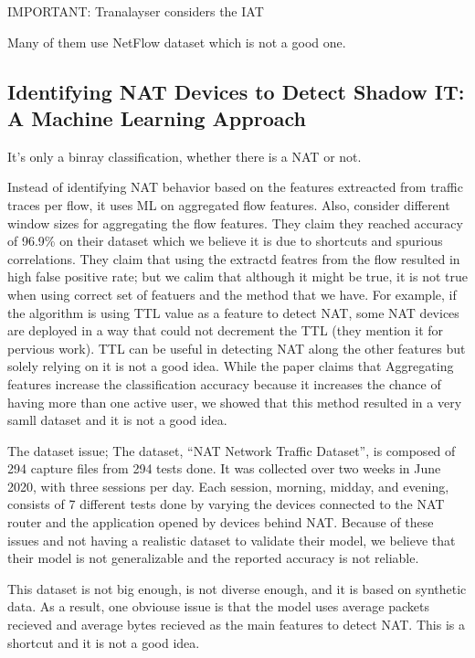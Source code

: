 IMPORTANT: Tranalayser considers the IAT 

Many of them use NetFlow dataset which is not a good one. 

\subsection{Identifying NAT Devices to Detect Shadow IT: A Machine Learning Approach \cite{nassar2021identifying}}
It's only a binray classification, whether there is a NAT or not.

Instead of identifying NAT behavior based on the features extreacted from traffic traces per flow, it uses ML on aggregated flow features. Also, consider different window sizes for aggregating the flow features. They claim they reached accuracy of 96.9\% on their dataset which we believe it is due to shortcuts and spurious correlations. They claim that using the extractd featres from the flow resulted in high false positive rate; but we calim that although it might be true, it is not true when using correct set of featuers and the method that we have.  For example, if the algorithm is using TTL value as a feature to detect NAT, some NAT devices are deployed in a way that could not decrement the TTL (they mention it for pervious work). TTL can be useful in detecting NAT along the other features but solely relying on it is not a good idea. 
While the paper claims that Aggregating features increase the classification accuracy because it increases the chance of having more than one active user, we showed that this method resulted in a very samll dataset and it is not a good idea. 


The dataset issue; The dataset, “NAT Network Traffic Dataset”, is composed of 294 capture files from 294 tests done. It was collected over two weeks in June 2020, with three sessions per day. Each session, morning, midday, and evening, consists of 7 different tests done by varying the devices connected to the NAT router and the application opened by devices behind 
NAT. Because of these issues and not having a realistic dataset to validate their model, we believe that their model is not generalizable and the reported accuracy is not reliable.

This dataset is not big enough, is not diverse enough, and it is based on synthetic data. As a result, one obviouse issue is that the model uses average packets recieved and average bytes recieved as the main features to detect NAT. This is a shortcut and it is not a good idea.

